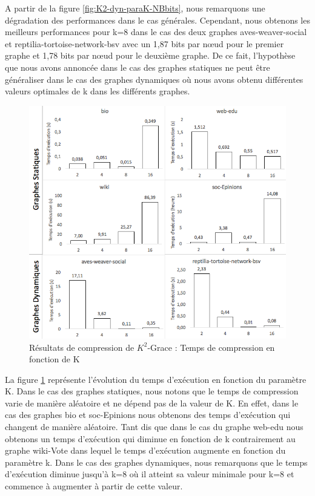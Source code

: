 A partir de la figure \ref{fig:K2-dyn-paraK-NBbits}, nous remarquons une dégradation des performances dans le cas générales. Cependant, nous obtenons les meilleurs performances pour k=8 dans le cas des deux graphes aves-weaver-social et reptilia-tortoise-network-bsv avec un 1,87 bits par nœud pour le premier graphe et 1,78 bits par nœud pour le deuxième graphe. De ce fait, l'hypothèse que nous avons annoncée dans le cas des graphes statiques ne peut être généraliser dans le cas des graphes dynamiques où nous avons obtenu différentes valeurs optimales de k dans les différents graphes. 

\begin{figure}[H]
	\centering
	\includegraphics[scale=0.6]{ressources/image/Tests/K2-Texec.png}
	
	\caption{Résultats de compression de $K^2$-Grace : Temps de compression en fonction de K}
	\label{fig:K2-Texec}
\end{figure}

La figure \ref{fig:K2-Texec} représente l'évolution du temps d'exécution en fonction du paramètre K. Dans le cas des graphes statiques, nous notons que le temps de compression varie de manière aléatoire et ne dépend pas de la valeur de K. En effet, dans le cas des graphes bio et soc-Epinions nous obtenons des temps d'exécution qui changent de manière aléatoire. Tant dis que dans le cas du graphe web-edu nous obtenons un temps d'exécution qui diminue en fonction de k contrairement au graphe wiki-Vote dans lequel le temps d'exécution  augmente en fonction du paramètre k. Dans le cas des graphes dynamiques, nous remarquons que le temps d'exécution diminue jusqu'à k=8 où il atteint sa valeur minimale pour k=8 et commence à augmenter à partir de cette valeur.
			
